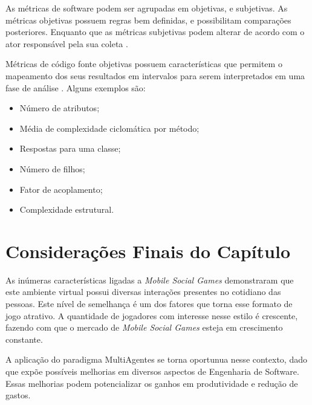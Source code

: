 As métricas de software podem ser agrupadas em objetivas, e subjetivas. As métricas
objetivas possuem regras bem definidas, e possibilitam comparações posteriores.
Enquanto que as métricas subjetivas podem alterar de acordo com o ator responsável
pela sua coleta \cite{meirelles2013}.

Métricas de código fonte objetivas possuem características que permitem o mapeamento
dos seus resultados em intervalos para serem interpretados em uma fase de análise
\cite{meirelles2013}. Alguns exemplos são:

\begin{itemize}
  \item Número de atributos;
  \item Média de complexidade ciclomática por método;
  \item Respostas para uma classe;
  \item Número de filhos;
  \item Fator de acoplamento;
  \item Complexidade estrutural.
\end{itemize}

\section{Considerações Finais do Capítulo}

As inúmeras características ligadas a \textit{Mobile Social Games} demonstraram que este
ambiente virtual possui diversas interações presentes no cotidiano das pessoas. Este nível
de semelhança é um dos fatores que torna esse formato de jogo atrativo. A quantidade de
jogadores com interesse nesse estilo é crescente, fazendo com que o mercado
de \textit{Mobile Social Games} esteja em crescimento constante.

A aplicação do paradigma MultiAgentes se torna oportunua nesse contexto, dado que expõe
possíveis melhorias em diversos aspectos de Engenharia de Software. Essas melhorias podem
potencializar os ganhos em produtividade e redução de gastos.
